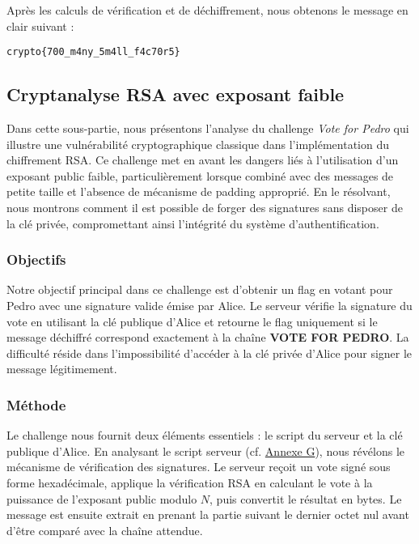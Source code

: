 Après les calculs de vérification et de déchiffrement, nous obtenons le message en clair suivant :

    \begin{center}
      \texttt{crypto\{700\_m4ny\_5m4ll\_f4c70r5\}}
    \end{center}


\subsection{Cryptanalyse RSA avec exposant faible}
Dans cette sous-partie, nous présentons l’analyse du challenge \textit{Vote for Pedro} qui illustre une vulnérabilité cryptographique classique dans l’implémentation du chiffrement RSA. Ce challenge met en avant les dangers liés à l’utilisation d’un exposant public faible, particulièrement lorsque combiné avec des messages de petite taille et l’absence de mécanisme de padding approprié. En le résolvant, nous montrons comment il est possible de forger des signatures sans disposer de la clé privée, compromettant ainsi l’intégrité du système d’authentification.


\subsubsection{Objectifs}
Notre objectif principal dans ce challenge est d’obtenir un flag en votant pour Pedro avec une signature valide émise par Alice. Le serveur vérifie la signature du vote en utilisant la clé publique d’Alice et retourne le flag uniquement si le message déchiffré correspond exactement à la chaîne \textbf{VOTE FOR PEDRO}. La difficulté réside dans l’impossibilité d’accéder à la clé privée d’Alice pour signer le message légitimement.


\subsubsection{Méthode}
Le challenge nous fournit deux éléments essentiels : le script du serveur et la clé publique d’Alice. En analysant le script serveur (cf. \hyperref[annexe:script-vote]{Annexe G}), nous révélons le mécanisme de vérification des signatures. Le serveur reçoit un vote signé sous forme hexadécimale, applique la vérification RSA en calculant le vote à la puissance de l’exposant public modulo $N$, puis convertit le résultat en bytes. Le message est ensuite extrait en prenant la partie suivant le dernier octet nul avant d’être comparé avec la chaîne attendue.

